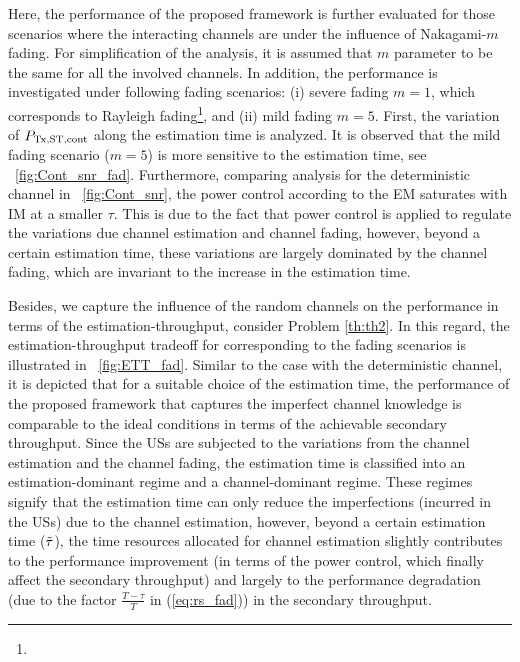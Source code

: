 Here, the performance of the proposed framework is further evaluated for those scenarios where the interacting channels are under the influence of Nakagami-$m$ fading. For simplification of the analysis, it is assumed that $m$ parameter to be the same for all the involved channels. In addition, the performance is investigated under following fading scenarios: (i) severe fading $m=1$, which corresponds to Rayleigh fading\footnote{}, and (ii) mild fading $m = 5$. First, the variation of $P_{\text{Tx,ST,cont}}$ along the estimation time is analyzed. It is observed that the mild fading scenario ($m = 5$) is more sensitive to the estimation time, see \figurename~\ref{fig:Cont_snr_fad}. Furthermore, comparing analysis for the deterministic channel in \figurename~\ref{fig:Cont_snr}, the power control according to the EM saturates with IM at a smaller $\tau$. This is due to the fact that power control is applied to regulate the variations due channel estimation and channel fading, however, beyond a certain estimation time, these variations are largely dominated by the channel fading, which are invariant to the increase in the estimation time. 

Besides, we capture the influence of the random channels on the performance in terms of the estimation-throughput, consider Problem \ref{th:th2}. In this regard, the estimation-throughput tradeoff for corresponding to the fading scenarios is illustrated in \figurename~\ref{fig:ETT_fad}. Similar to the case with the deterministic channel, it is depicted that for a suitable choice of the estimation time, the performance of the proposed framework that captures the imperfect channel knowledge is comparable to the ideal conditions in terms of the achievable secondary throughput. Since the USs are subjected to the variations from the channel estimation and the channel fading, the estimation time is classified into an estimation-dominant regime and a channel-dominant regime. These regimes signify that the estimation time can only reduce the imperfections (incurred in the USs) due to the channel estimation, however, beyond a certain estimation time ($\tilde{\tau}$), the time resources allocated for channel estimation slightly contributes to the performance improvement (in terms of the power control, which finally affect the secondary throughput) and largely to the performance degradation (due to the factor $\frac{T - \tau}{T}$ in (\ref{eq:rs_fad})) in the secondary throughput. 

